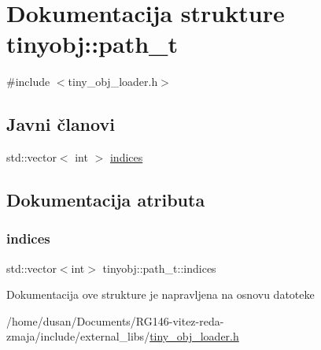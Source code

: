 \hypertarget{structtinyobj_1_1path__t}{}\section{Dokumentacija strukture tinyobj\+:\+:path\+\_\+t}
\label{structtinyobj_1_1path__t}


{\ttfamily \#include $<$tiny\+\_\+obj\+\_\+loader.\+h$>$}

\subsection*{Javni članovi}
\begin{DoxyCompactItemize}
\item 
std\+::vector$<$ int $>$ \hyperlink{structtinyobj_1_1path__t_ab6ce1d658025985d26ad90d88ff91a60}{indices}
\end{DoxyCompactItemize}


\subsection{Dokumentacija atributa}
\mbox{\label{structtinyobj_1_1path__t_ab6ce1d658025985d26ad90d88ff91a60}} 
\subsubsection{\texorpdfstring{indices}{indices}}
{\footnotesize\ttfamily std\+::vector$<$int$>$ tinyobj\+::path\+\_\+t\+::indices}



Dokumentacija ove strukture je napravljena na osnovu datoteke \begin{DoxyCompactItemize}
\item 
/home/dusan/\+Documents/\+R\+G146-\/vitez-\/reda-\/zmaja/include/external\+\_\+libs/\hyperlink{tiny__obj__loader_8h}{tiny\+\_\+obj\+\_\+loader.\+h}\end{DoxyCompactItemize}
